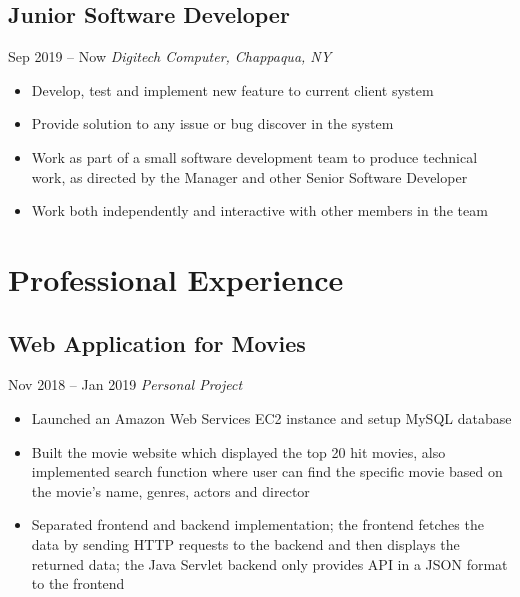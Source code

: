 \documentclass[11pt, letterpaper]{article} %
\begin{document}
\subsection{Junior Software Developer}
\hspace*{\fill}Sep 2019 -- Now
\linebreak
\vspace{-0.8em}
\textit{Digitech Computer, Chappaqua, NY}
\begin{itemize}
	\setlength\itemsep{-0.5em}
	\item Develop, test and implement new feature to current client system
	\item Provide solution to any issue or bug discover in the system
	\item Work as part of a small software development team to produce technical work, as directed by the Manager and other Senior Software Developer
	\item Work both independently and interactive with other members in the team
\end{itemize}

\vspace{0.5em}
\section{Professional Experience}
\subsection{Web Application for Movies}
\hspace*{\fill}Nov 2018 -- Jan 2019
\linebreak
\vspace{-0.7em}
\textit{Personal Project}
\begin{itemize}
	\setlength\itemsep{-0.5em}
	\item Launched an Amazon Web Services EC2 instance and setup MySQL database
	\item Built the movie website which displayed the top 20 hit movies, also implemented search function where user can find the specific movie based on the movie's name, genres, actors and director
	\item Separated frontend and backend implementation; the frontend fetches the data by sending HTTP requests to the backend and then displays the returned data; the Java Servlet backend only provides API in a JSON format to the frontend
\end{itemize}
\vspace{-0.5em}
\end{document}
